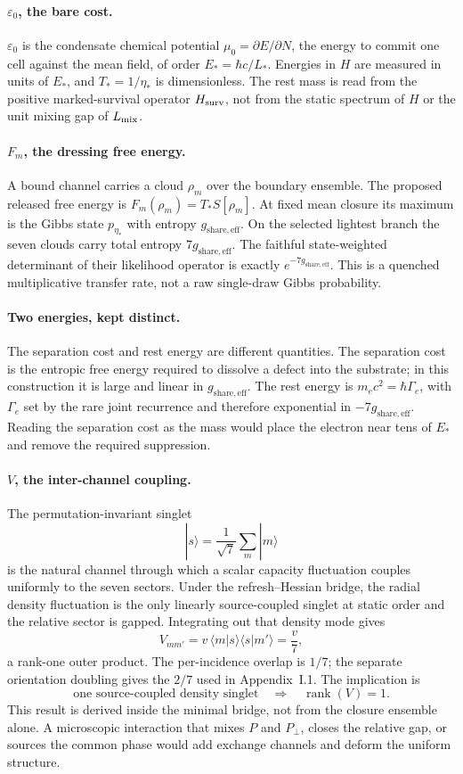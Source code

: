 \documentclass[11pt]{article}
\begin{document}
\paragraph{$\varepsilon_0$, the bare cost.}
$\varepsilon_0$ is the condensate chemical potential $\mu_0=\partial E/\partial N$, the energy to commit one cell against the mean field, of order $E_*=\hbar c/L_*$. Energies in $H$ are measured in units of $E_*$, and $T_*=1/\eta_*$ is dimensionless. The rest mass is read from the positive marked-survival operator $H_{\rm surv}$, not from the static spectrum of $H$ or the unit mixing gap of $L_{\rm mix}$.

\paragraph{$F_m$, the dressing free energy.}
A bound channel carries a cloud $\rho_m$ over the boundary ensemble. The proposed released free energy is $F_m(\rho_m)=T_*S[\rho_m]$. At fixed mean closure its maximum is the Gibbs state $p_{\eta_*}$ with entropy $g_{\mathrm{share,eff}}$. On the selected lightest branch the seven clouds carry total entropy $7g_{\mathrm{share,eff}}$. The faithful state-weighted determinant of their likelihood operator is exactly $e^{-7g_{\mathrm{share,eff}}}$. This is a quenched multiplicative transfer rate, not a raw single-draw Gibbs probability.

\paragraph{Two energies, kept distinct.}
The separation cost and rest energy are different quantities. The separation cost is the entropic free energy required to dissolve a defect into the substrate; in this construction it is large and linear in $g_{\mathrm{share,eff}}$. The rest energy is $m_ec^2=\hbar\Gamma_e$, with $\Gamma_e$ set by the rare joint recurrence and therefore exponential in $-7g_{\mathrm{share,eff}}$. Reading the separation cost as the mass would place the electron near tens of $E_*$ and remove the required suppression.

\paragraph{$V$, the inter-channel coupling.}
The permutation-invariant singlet
\[
|s\rangle=\frac{1}{\sqrt7}\sum_m|m\rangle
\]
is the natural channel through which a scalar capacity fluctuation couples uniformly to the seven sectors. Under the refresh--Hessian bridge, the radial density fluctuation is the only linearly source-coupled singlet at static order and the relative sector is gapped. Integrating out that density mode gives
\[
V_{mm'}=v\,\langle m|s\rangle\langle s|m'\rangle=\frac{v}{7},
\]
a rank-one outer product. The per-incidence overlap is $1/7$; the separate orientation doubling gives the $2/7$ used in Appendix~I.1. The implication is
\[
\text{one source-coupled density singlet}\quad\Longrightarrow\quad \operatorname{rank}(V)=1.
\]
This result is derived inside the minimal bridge, not from the closure ensemble alone. A microscopic interaction that mixes $P$ and $P_\perp$, closes the relative gap, or sources the common phase would add exchange channels and deform the uniform structure.
\end{document}
